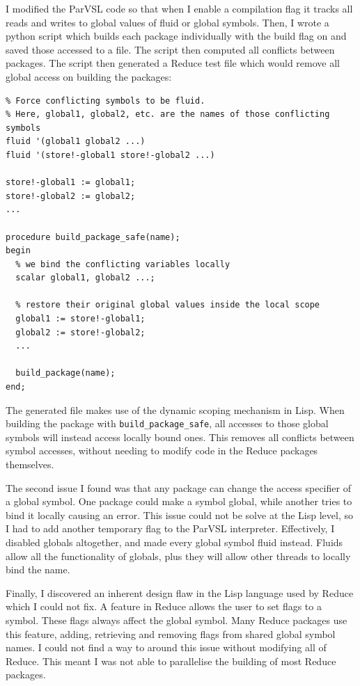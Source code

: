 I modified the ParVSL code so that when I enable a compilation flag it tracks all
reads and writes to global values of fluid or global symbols. Then, I wrote a python
script which builds each package individually with the build flag on and saved those
accessed to a file. The script then computed all conflicts between packages. The script
then generated a Reduce test file which would remove all global access on building the packages:

\begin{verbatim}
% Force conflicting symbols to be fluid.
% Here, global1, global2, etc. are the names of those conflicting symbols
fluid '(global1 global2 ...)
fluid '(store!-global1 store!-global2 ...)

store!-global1 := global1;
store!-global2 := global2;
...

procedure build_package_safe(name);
begin
  % we bind the conflicting variables locally
  scalar global1, global2 ...;

  % restore their original global values inside the local scope
  global1 := store!-global1;
  global2 := store!-global2;
  ...

  build_package(name);
end;
\end{verbatim}

The generated file makes use of the dynamic scoping mechanism in Lisp. When building the package
with \texttt{build\_package\_safe}, all accesses to those global symbols will instead access locally
bound ones. This removes all conflicts between symbol accesses, without needing to modify code in
the Reduce packages themselves.

The second issue I found was that any package can change the access specifier of a global symbol.
One package could make a symbol global, while another tries to bind it locally causing an error.
This issue could not be solve at the Lisp level, so I had to add another temporary flag to the
ParVSL interpreter. Effectively, I disabled globals altogether, and made every global symbol
fluid instead. Fluids allow all the functionality of globals, plus they will allow other threads
to locally bind the name.

Finally, I discovered an inherent design flaw in the Lisp language used by Reduce which I could not
fix. A feature in Reduce allows the user to set flags to a symbol. These flags always affect the global
symbol. Many Reduce packages use this feature, adding, retrieving and removing flags from shared
global symbol names. I could not find a way to around this issue without modifying all of Reduce.
This meant I was not able to parallelise the building of most Reduce packages.

